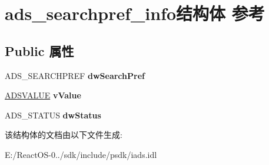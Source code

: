 \hypertarget{structads__searchpref__info}{}\section{ads\+\_\+searchpref\+\_\+info结构体 参考}
\label{structads__searchpref__info}
\subsection*{Public 属性}
\begin{DoxyCompactItemize}
\item 
\mbox{\label{structads__searchpref__info_a9e3e19aa73bad2f26c23f3211bfb0f97}} 
A\+D\+S\+\_\+\+S\+E\+A\+R\+C\+H\+P\+R\+EF {\bfseries dw\+Search\+Pref}
\item 
\mbox{\label{structads__searchpref__info_a63a503d71c73207257c125da16719c9e}} 
\hyperlink{struct__adsvalue}{A\+D\+S\+V\+A\+L\+UE} {\bfseries v\+Value}
\item 
\mbox{\label{structads__searchpref__info_a421d7b70b508d78a862131726c6c8e65}} 
A\+D\+S\+\_\+\+S\+T\+A\+T\+US {\bfseries dw\+Status}
\end{DoxyCompactItemize}


该结构体的文档由以下文件生成\+:\begin{DoxyCompactItemize}
\item 
E\+:/\+React\+O\+S-\/0../sdk/include/psdk/iads.\+idl\end{DoxyCompactItemize}
